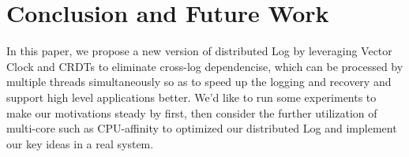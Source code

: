 \section{Conclusion and Future Work}

In this paper, we propose a new version of distributed Log by leveraging Vector Clock and CRDTs to eliminate cross-log dependencise, which can be processed by multiple threads simultaneously so as to speed up the logging and recovery and support high level applications better. We'd like to run some experiments to make our motivations steady by first, then consider the further utilization of multi-core such as CPU-affinity to optimized our distributed Log and implement our key ideas in a real system.
